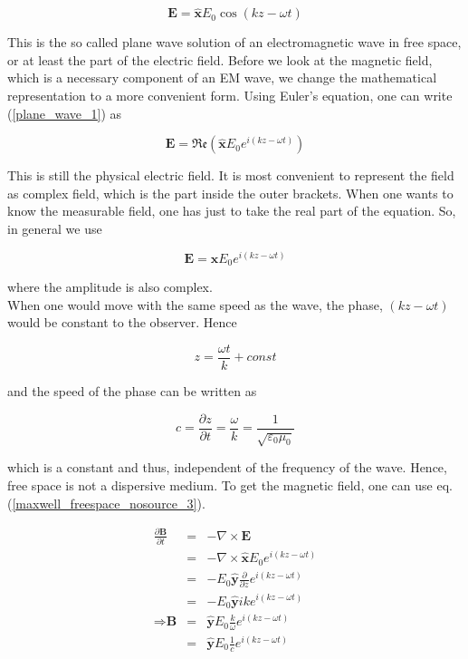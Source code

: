 \documentclass[a4paper,14pt]{extbook}
\begin{document}
\begin{equation}\label{plane_wave_1}
    \mathbf{E}= \mathbf{\hat{x}}E_0\cos(kz-\omega t)
\end{equation}

This is the so called plane wave solution of an electromagnetic wave in free space, or at least the part of the electric field. Before we look at the magnetic field, which is a necessary component of an EM wave, we change the mathematical representation to a more convenient form. Using Euler's equation, one can write (\ref{plane_wave_1}) as

\begin{equation}\label{plane_wave_2}
    \mathbf{E}= \mathfrak{Re} \left( \mathbf{\hat{x}}E_0 e^{i(kz-\omega t)} \right)
\end{equation}

This is still the physical electric field. It is most convenient to represent the field as complex field, which is the part inside the outer brackets. When one wants to know the measurable field, one has just to take the real part of the equation. So, in general we use

\begin{equation}\label{plane_wave_3}
    \mathbf{E}= \mathbf{\hat{x}}E_0 e^{i(kz-\omega t)}
\end{equation}

where the amplitude is also complex.\\

When one would move with the same speed as the wave, the phase, $(kz-\omega t)$ would be constant to the observer. Hence

\begin{equation}
    z= \frac{\omega t}{k}+ const
\end{equation}

and the speed of the phase can be written as

\begin{equation}\label{lichtgeschwindigkeit}
    c= \frac{\partial z}{\partial t} = \frac{\omega}{k} =\frac{1}{\sqrt{\varepsilon_0 \mu_0 }}
\end{equation}

which is a constant and thus, independent of the frequency of the wave. Hence, free space is not a dispersive medium. To get the magnetic field, one can use eq. (\ref{maxwell_freespace_nosource_3}).

\begin{eqnarray}
\frac{\partial \mathbf{B}}{\partial t} &=& -\nabla \times \mathbf{E}\\
&=& - \nabla \times \mathbf{\hat{x}}E_0 e^{i(kz-\omega t)} \nonumber \\
&=& - E_0 \mathbf{\hat{y}} \frac{\partial}{\partial z} e^{i(kz-\omega t)} \nonumber \\
&=& - E_0 \mathbf{\hat{y}} ik e^{i(kz-\omega t)} \nonumber \\
\Rightarrow \textbf{B} &=& \mathbf{\hat{y}} E_0 \frac{k}{\omega} e^{i(kz-\omega t)} \label{plane_wave_B} \\
&=&\mathbf{\hat{y}} E_0 \frac{1}{c} e^{i(kz-\omega t)}\nonumber
\end{eqnarray}
\end{document}
